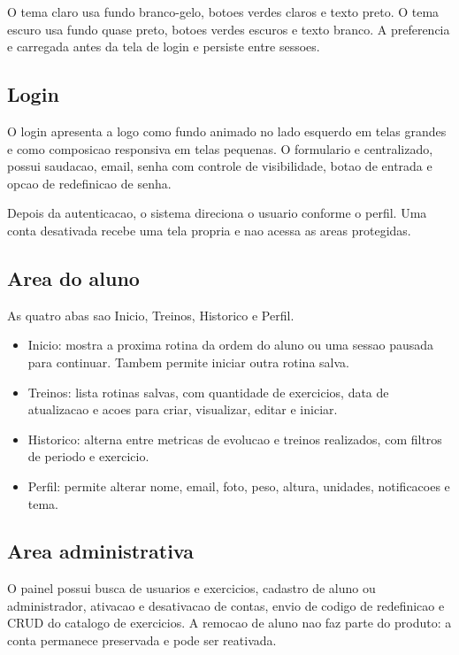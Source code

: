 \documentclass[12pt,a4paper]{article}
\begin{document}
O tema claro usa fundo branco-gelo, botoes verdes claros e texto preto. O tema escuro usa fundo quase preto, botoes verdes escuros e texto branco. A preferencia e carregada antes da tela de login e persiste entre sessoes.

\subsection{Login}

O login apresenta a logo como fundo animado no lado esquerdo em telas grandes e como composicao responsiva em telas pequenas. O formulario e centralizado, possui saudacao, email, senha com controle de visibilidade, botao de entrada e opcao de redefinicao de senha.

Depois da autenticacao, o sistema direciona o usuario conforme o perfil. Uma conta desativada recebe uma tela propria e nao acessa as areas protegidas.

\subsection{Area do aluno}

As quatro abas sao Inicio, Treinos, Historico e Perfil.

\begin{itemize}[leftmargin=*]
    \item Inicio: mostra a proxima rotina da ordem do aluno ou uma sessao pausada para continuar. Tambem permite iniciar outra rotina salva.
    \item Treinos: lista rotinas salvas, com quantidade de exercicios, data de atualizacao e acoes para criar, visualizar, editar e iniciar.
    \item Historico: alterna entre metricas de evolucao e treinos realizados, com filtros de periodo e exercicio.
    \item Perfil: permite alterar nome, email, foto, peso, altura, unidades, notificacoes e tema.
\end{itemize}

\subsection{Area administrativa}

O painel possui busca de usuarios e exercicios, cadastro de aluno ou administrador, ativacao e desativacao de contas, envio de codigo de redefinicao e CRUD do catalogo de exercicios. A remocao de aluno nao faz parte do produto: a conta permanece preservada e pode ser reativada.
\end{document}
